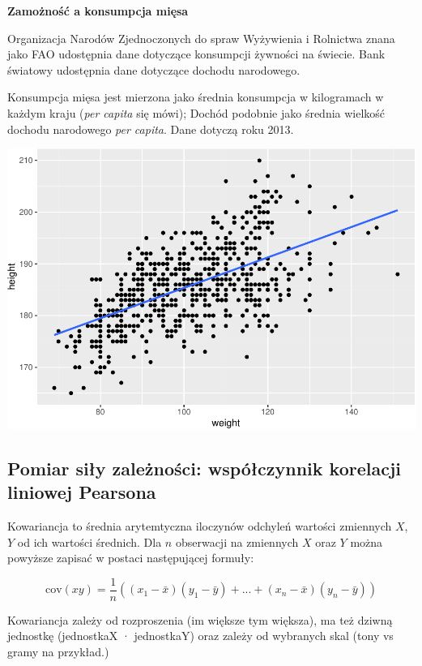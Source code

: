 \documentclass[
  openany]{book}
\begin{document}
\begin{example}
\textbf{Zamożność a konsumpcja mięsa}

Organizacja Narodów Zjednoczonych do spraw Wyżywienia i Rolnictwa znana jako FAO
udostępnia dane dotyczące konsumpcji żywności na świecie. Bank światowy
udostępnia dane dotyczące dochodu narodowego.

Konsumpcja mięsa jest mierzona jako średnia konsumpcja w kilogramach w każdym kraju (\emph{per capita} się mówi);
Dochód podobnie jako średnia wielkość dochodu narodowego \emph{per capita}.
Dane dotyczą roku 2013.

\includegraphics{_main_files/figure-latex/unnamed-chunk-56-1.pdf}
\end{example}

\hypertarget{pomiar-siux142y-zaleux17cnoux15bci-wspuxf3ux142czynnik-korelacji-liniowej-pearsona}{%
\subsection{Pomiar siły zależności: współczynnik korelacji liniowej Pearsona}\label{pomiar-siux142y-zaleux17cnoux15bci-wspuxf3ux142czynnik-korelacji-liniowej-pearsona}}

Kowariancja to średnia arytemtyczna iloczynów odchyleń wartości zmiennych \(X\), \(Y\)
od ich wartości średnich. Dla \(n\) obserwacji na zmiennych \(X\) oraz \(Y\)
można powyższe zapisać w postaci następującej formuły:

\[\mathrm{cov} (xy) = \frac{1}{n} \left( (x_1 - \bar x) (y_1 - \bar y)  + ... +
(x_n- \bar x) (y_n - \bar y) \right)\]

Kowariancja zależy od rozproszenia (im większe tym większa),
ma też dziwną jednostkę (jednostkaX · jednostkaY) oraz zależy
od wybranych skal (tony vs gramy na przykład.)
\end{document}
